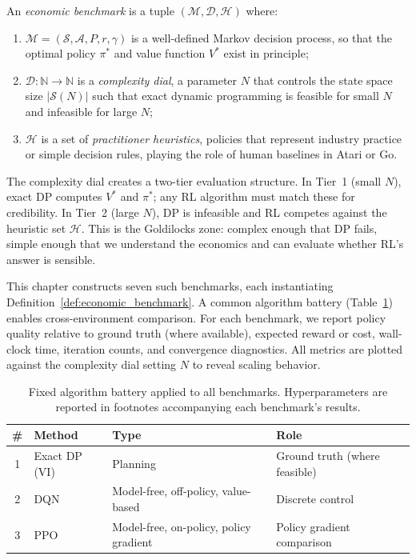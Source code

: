\begin{definition}
\label{def:economic_benchmark}
An \emph{economic benchmark} is a tuple $(\mathcal{M}, \mathcal{D}, \mathcal{H})$ where:
\begin{enumerate}
    \item $\mathcal{M} = (\mathcal{S}, \mathcal{A}, P, r, \gamma)$ is a well-defined Markov decision process, so that the optimal policy $\pi^*$ and value function $V^*$ exist in principle;
    \item $\mathcal{D}: \mathbb{N} \to \mathbb{N}$ is a \emph{complexity dial}, a parameter $N$ that controls the state space size $|\mathcal{S}(N)|$ such that exact dynamic programming is feasible for small $N$ and infeasible for large $N$;
    \item $\mathcal{H}$ is a set of \emph{practitioner heuristics}, policies that represent industry practice or simple decision rules, playing the role of human baselines in Atari or Go.
\end{enumerate}
\end{definition}

The complexity dial creates a two-tier evaluation structure. In Tier~1 (small $N$), exact DP computes $V^*$ and $\pi^*$; any RL algorithm must match these for credibility. In Tier~2 (large $N$), DP is infeasible and RL competes against the heuristic set $\mathcal{H}$. This is the Goldilocks zone: complex enough that DP fails, simple enough that we understand the economics and can evaluate whether RL's answer is sensible.

This chapter constructs seven such benchmarks, each instantiating Definition~\ref{def:economic_benchmark}. A common algorithm battery (Table~\ref{tab:algorithm_battery}) enables cross-environment comparison. For each benchmark, we report policy quality relative to ground truth (where available), expected reward or cost, wall-clock time, iteration counts, and convergence diagnostics. All metrics are plotted against the complexity dial setting $N$ to reveal scaling behavior.

\begin{table}[h!]
\centering
\caption{Fixed algorithm battery applied to all benchmarks. Hyperparameters are reported in footnotes accompanying each benchmark's results.}
\label{tab:algorithm_battery}
\begin{tabular}{clll}
\toprule
\# & Method & Type & Role \\
\midrule
1 & Exact DP (VI) & Planning & Ground truth (where feasible) \\
2 & DQN & Model-free, off-policy, value-based & Discrete control \\
3 & PPO & Model-free, on-policy, policy gradient & Policy gradient comparison \\
\bottomrule
\end{tabular}
\end{table}


